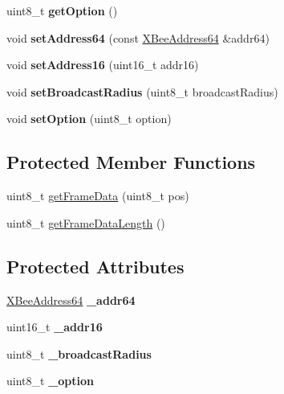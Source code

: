 \begin{DoxyCompactItemize}
uint8\+\_\+t {\bfseries get\+Option} ()
\item 
\hypertarget{class_z_b_tx_request_a64c6983507f8d5d97ae6509b56e74115}{}\label{class_z_b_tx_request_a64c6983507f8d5d97ae6509b56e74115} 
void {\bfseries set\+Address64} (const \hyperlink{class_x_bee_address64}{X\+Bee\+Address64} \&addr64)
\item 
\hypertarget{class_z_b_tx_request_aa1ae1761a27f335d353428de9c986aff}{}\label{class_z_b_tx_request_aa1ae1761a27f335d353428de9c986aff} 
void {\bfseries set\+Address16} (uint16\+\_\+t addr16)
\item 
\hypertarget{class_z_b_tx_request_a2d2825234b6d42385998df927d0fe0cb}{}\label{class_z_b_tx_request_a2d2825234b6d42385998df927d0fe0cb} 
void {\bfseries set\+Broadcast\+Radius} (uint8\+\_\+t broadcast\+Radius)
\item 
\hypertarget{class_z_b_tx_request_a32b2ea4b2c457396a7463e2add7e14f6}{}\label{class_z_b_tx_request_a32b2ea4b2c457396a7463e2add7e14f6} 
void {\bfseries set\+Option} (uint8\+\_\+t option)
\end{DoxyCompactItemize}
\subsection*{Protected Member Functions}
\begin{DoxyCompactItemize}
\item 
uint8\+\_\+t \hyperlink{class_z_b_tx_request_ac81e09dfbf7aefbdf7f8b4838b643c5c}{get\+Frame\+Data} (uint8\+\_\+t pos)
\item 
uint8\+\_\+t \hyperlink{class_z_b_tx_request_a8e6914c1f556981a0f863c57c57d053b}{get\+Frame\+Data\+Length} ()
\end{DoxyCompactItemize}
\subsection*{Protected Attributes}
\begin{DoxyCompactItemize}
\item 
\hypertarget{class_z_b_tx_request_a467176e98070e35d5472d82422c87fec}{}\label{class_z_b_tx_request_a467176e98070e35d5472d82422c87fec} 
\hyperlink{class_x_bee_address64}{X\+Bee\+Address64} {\bfseries \+\_\+addr64}
\item 
\hypertarget{class_z_b_tx_request_a73830b82661b1df048b73131fe912577}{}\label{class_z_b_tx_request_a73830b82661b1df048b73131fe912577} 
uint16\+\_\+t {\bfseries \+\_\+addr16}
\item 
\hypertarget{class_z_b_tx_request_aed21dee6aa228accb4450fc8428a043f}{}\label{class_z_b_tx_request_aed21dee6aa228accb4450fc8428a043f} 
uint8\+\_\+t {\bfseries \+\_\+broadcast\+Radius}
\item 
\hypertarget{class_z_b_tx_request_a5a1c785ce15bdcf085b8505bb35ae0b2}{}\label{class_z_b_tx_request_a5a1c785ce15bdcf085b8505bb35ae0b2} 
uint8\+\_\+t {\bfseries \+\_\+option}
\end{DoxyCompactItemize}



